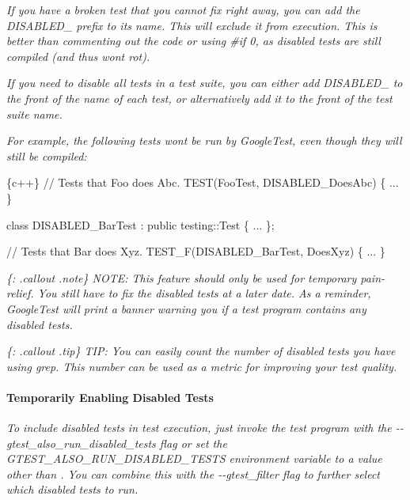 {\itshape }

{\itshape If you have a broken test that you cannot fix right away, you can add the {\ttfamily D\+I\+S\+A\+B\+L\+E\+D\+\_\+} prefix to its name. This will exclude it from execution. This is better than commenting out the code or using {\ttfamily \#if 0}, as disabled tests are still compiled (and thus won\textquotesingle{}t rot).}

{\itshape If you need to disable all tests in a test suite, you can either add {\ttfamily D\+I\+S\+A\+B\+L\+E\+D\+\_\+} to the front of the name of each test, or alternatively add it to the front of the test suite name.}

{\itshape For example, the following tests won\textquotesingle{}t be run by Google\+Test, even though they will still be compiled\+:}

{\itshape 
\begin{DoxyCode}
\{c++\}
// Tests that Foo does Abc.
TEST(FooTest, DISABLED\_DoesAbc) \{ ... \}

class DISABLED\_BarTest : public testing::Test \{ ... \};

// Tests that Bar does Xyz.
TEST\_F(DISABLED\_BarTest, DoesXyz) \{ ... \}
\end{DoxyCode}
}

{\itshape \{\+: .callout .note\} N\+O\+TE\+: This feature should only be used for temporary pain-\/relief. You still have to fix the disabled tests at a later date. As a reminder, Google\+Test will print a banner warning you if a test program contains any disabled tests.}

{\itshape \{\+: .callout .tip\} T\+IP\+: You can easily count the number of disabled tests you have using {\ttfamily grep}. This number can be used as a metric for improving your test quality.}

{\itshape \paragraph*{Temporarily Enabling Disabled Tests}}

{\itshape }

{\itshape To include disabled tests in test execution, just invoke the test program with the {\ttfamily -\/-\/gtest\+\_\+also\+\_\+run\+\_\+disabled\+\_\+tests} flag or set the {\ttfamily G\+T\+E\+S\+T\+\_\+\+A\+L\+S\+O\+\_\+\+R\+U\+N\+\_\+\+D\+I\+S\+A\+B\+L\+E\+D\+\_\+\+T\+E\+S\+TS} environment variable to a value other than {}. You can combine this with the {\ttfamily -\/-\/gtest\+\_\+filter} flag to further select which disabled tests to run.}

